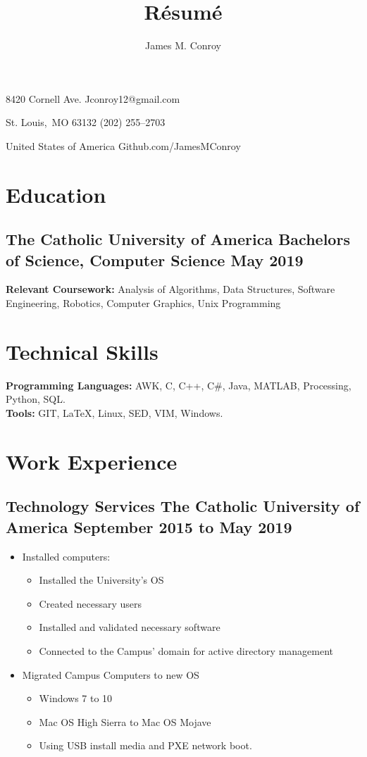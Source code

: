 \documentclass[12pt, letterpaper]{article}
\author{James M. Conroy}
\title{R\'esum\'e}
\makeatletter
\renewcommand{\maketitle} {
	\begin{center}
	{\Large\bfseries
	\theauthor}

	\end{center}

	\setlength{\parindent}{0pt}
	\setlength{\parskip}{0em}
	8420 Cornell Ave.
	\hfill Jconroy12@gmail.com

	St. Louis,\ MO 63132
	\hfill (202) 255--2703

	United States of America
	\hfill Github.com/JamesMConroy
}
\makeatother
\begin{document}
\maketitle
\section{Education}
\subsection{The Catholic University of America \hspace {20pt} Bachelors of Science, Computer Science \hfill  May 2019 }

\noindent
\textbf{Relevant Coursework:}
Analysis of Algorithms,
Data Structures,
Software Engineering,
Robotics,
Computer Graphics,
Unix Programming

\section{Technical Skills}
\textbf{Programming Languages:}
AWK,
C,
C++,
C\#,
Java,
MATLAB,
Processing,
Python,
SQL.\\
\textbf{Tools:}
GIT,
\LaTeX,
Linux,
SED,
VIM,
Windows.

\section{Work Experience}
\subsection{Technology Services \hspace {20pt}The Catholic University of America \hfill September 2015 to May 2019}
\begin{itemize}
	\item Installed computers:
		\begin{itemize}
			\item Installed the University's OS
			\item Created necessary users
			\item Installed and validated necessary software
			\item Connected to the Campus' domain for active directory management
		\end{itemize}
	\item Migrated Campus Computers to new OS
		\begin{itemize}
			\item Windows 7 to 10
			\item Mac OS High Sierra to Mac OS Mojave
			\item Using USB install media and PXE network boot.
		\end{itemize}
\end{itemize}
\end{document}

